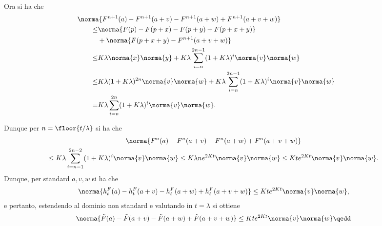 {\begin{itemize}
            Ora si ha che \begin{align*}
                &\hspace{-3em}\norma{F^{n+1}(a)-F^{n+1}(a+v)-F^{n+1}(a+w)+F^{n+1}(a+v+w)}\\ 
                \le  &\norma{F(p)-F(p+x)-F(p+y)+F(p+x+y)}\\&+\norma{F(p+x+y)-F^{n+1}(a+v+w)}\\ 
                \le &K \lambda\norma{x}\norma{y} + K \lambda\sum_{i=n}^{2n-1}(1+K\lambda)^{i}\norma{v}\norma{w} \\ 
                \le &K \lambda(1+K\lambda)^{2n}\norma{v}\norma{w} + K \lambda\sum_{i=n}^{2n-1}(1+K\lambda)^{i}\norma{v}\norma{w} \\ 
                = & K \lambda\sum_{i=n}^{2n}(1+K\lambda)^{i}\norma{v}\norma{w}. 
            \end{align*}
    \end{itemize}

    Dunque per $ n=\floor{t/\lambda} $ si ha che \begin{multline*}
        \norma{F^{n}(a)-F^{n}(a+v)-F^{n}(a+w)+F^{n}(a+v+w)} \\
        \le K \lambda\sum_{i=n-1}^{2n-2}(1+K\lambda)^{i}\norma{v}\norma{w} \le K \lambda n e^{2Kt}\norma{v}\norma{w} \le K t e^{2Kt}\norma{v}\norma{w}.
    \end{multline*}Dunque, per standard $ a,v,w $ si ha che \begin{equation*}
        \norma{h_{t}^F(a)-h_{t}^F(a+v)-h_{t}^F(a+w)+h_{t}^F(a+v+w)}\le K t e^{2Kt}\norma{v}\norma{w},
    \end{equation*}e pertanto, estendendo al dominio non standard e valutando in $ t= \lambda $ si ottiene \begin{equation*}
        \norma{\tilde{F}(a)-\tilde{F}(a+v)-\tilde{F}(a+w)+\tilde{F}(a+v+w)}\le K t e^{2Kt}\norma{v}\norma{w}\qedd
    \end{equation*}
}
